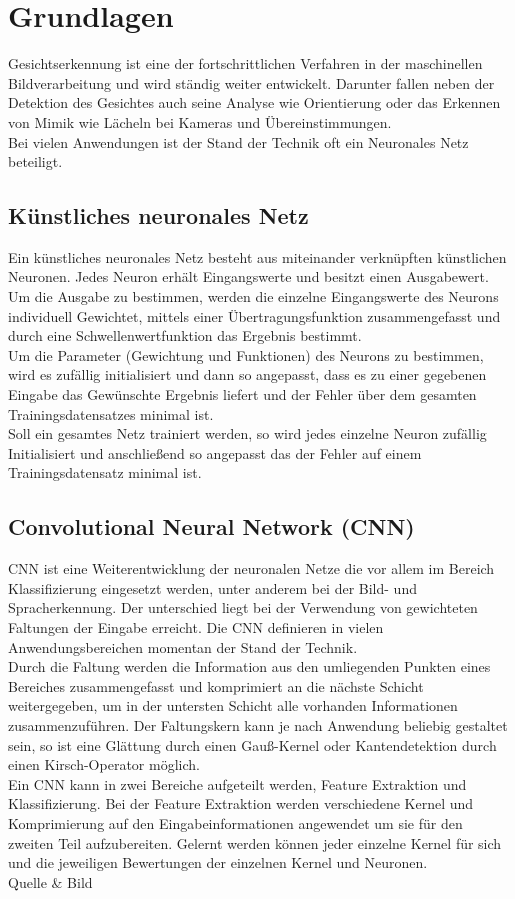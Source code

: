 \section{Grundlagen}
Gesichtserkennung ist eine der fortschrittlichen Verfahren in der maschinellen Bildverarbeitung und wird ständig weiter entwickelt. Darunter fallen neben der Detektion des Gesichtes auch seine Analyse wie Orientierung oder das Erkennen von Mimik wie Lächeln bei Kameras und Übereinstimmungen.\\
Bei vielen Anwendungen ist der Stand der Technik oft ein Neuronales Netz beteiligt.
\subsection{Künstliches neuronales Netz}
Ein künstliches neuronales Netz besteht aus miteinander verknüpften künstlichen Neuronen. Jedes Neuron erhält Eingangswerte und besitzt einen Ausgabewert.\\
Um die Ausgabe zu bestimmen, werden die einzelne Eingangswerte des Neurons individuell Gewichtet, mittels einer Übertragungsfunktion zusammengefasst und durch eine Schwellenwertfunktion das Ergebnis bestimmt.\\
Um die Parameter (Gewichtung und Funktionen) des Neurons zu bestimmen, wird es zufällig initialisiert und dann so angepasst, dass es zu einer gegebenen Eingabe das Gewünschte Ergebnis liefert und der Fehler über dem gesamten Trainingsdatensatzes minimal ist.\\
Soll ein gesamtes Netz trainiert werden, so wird jedes einzelne Neuron zufällig Initialisiert und anschließend so angepasst das der Fehler auf einem Trainingsdatensatz minimal ist.\\
\cite{Maschin_Neuron}
\subsection{Convolutional Neural Network (CNN)}
CNN ist eine Weiterentwicklung der neuronalen Netze die vor allem im Bereich Klassifizierung eingesetzt werden, unter anderem bei der Bild- und Spracherkennung. Der unterschied liegt bei der Verwendung von gewichteten Faltungen der Eingabe erreicht. Die CNN definieren in vielen Anwendungsbereichen momentan der Stand der Technik.\\
Durch die Faltung werden die Information aus den umliegenden Punkten eines Bereiches zusammengefasst und komprimiert an die nächste Schicht weitergegeben, um in der untersten Schicht alle vorhanden Informationen zusammenzuführen. 
Der Faltungskern kann je nach Anwendung beliebig gestaltet sein, so ist eine Glättung durch einen Gauß-Kernel oder Kantendetektion durch einen Kirsch-Operator möglich.\\
Ein CNN kann in zwei Bereiche aufgeteilt werden, Feature Extraktion und Klassifizierung. Bei der Feature Extraktion werden verschiedene Kernel und Komprimierung auf den Eingabeinformationen angewendet um sie für den zweiten Teil aufzubereiten.
Gelernt werden können jeder einzelne Kernel für sich und die jeweiligen Bewertungen der einzelnen Kernel und Neuronen.\\
Quelle \& Bild
